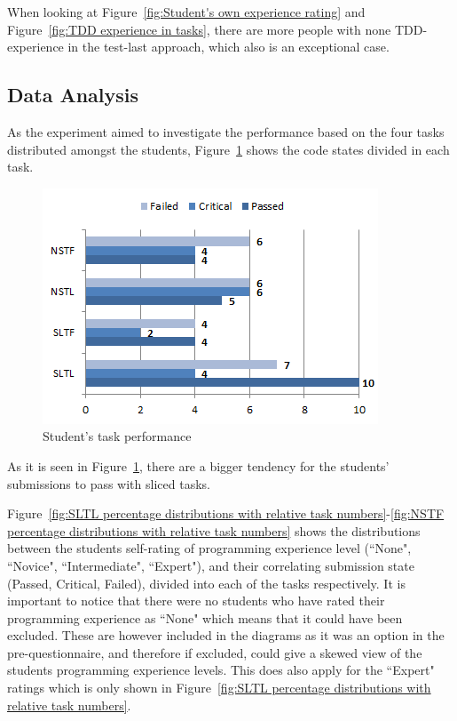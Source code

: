 \documentclass{sig-alternate-05-2015}
\begin{document}
When looking at Figure~\ref{fig:Student's own experience rating} and Figure~\ref{fig:TDD experience in tasks}, there are more people with none TDD-experience in the test-last approach, which also is an exceptional case.

\subsection{Data Analysis}
\label{DataAnalysis}
As the experiment aimed to investigate the performance based on the four tasks distributed amongst the students, Figure~\ref{fig:Student's task performance} shows the code states divided in each task.

\begin{figure}[!ht]
	\centering
	\includegraphics[width=1\linewidth]{img05}
	\caption{Student's task performance}
	\label{fig:Student's task performance}
\end{figure}

As it is seen in Figure~\ref{fig:Student's task performance}, there are a bigger tendency for the students' submissions to pass with sliced tasks.

Figure~\ref{fig:SLTL percentage distributions with relative task numbers}-\ref{fig:NSTF percentage distributions with relative task numbers} shows the distributions between the students self-rating of programming experience level (``None", ``Novice", ``Intermediate", ``Expert"), and their correlating submission state (Passed, Critical, Failed), divided into each of the tasks respectively.
It is important to notice that there were no students who have rated their programming experience  as ``None" which means that it could have been excluded. These are however included in the diagrams as it was an option in the pre-questionnaire, and therefore if excluded, could give a skewed view of the students programming experience levels. This does also apply for the ``Expert" ratings which is only shown in Figure~\ref{fig:SLTL percentage distributions with relative task numbers}.
\end{document}
